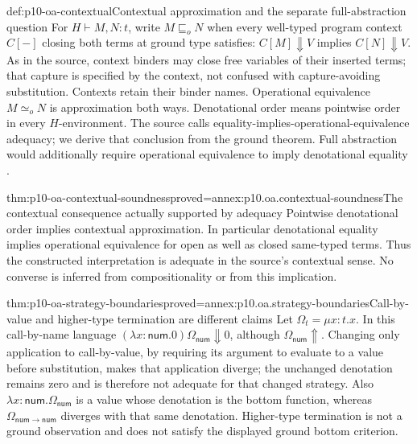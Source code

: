 \begin{hbdefinition}{def:p10-oa-contextual}{Contextual approximation and the separate full-abstraction question}
For \(H\vdash M,N:t\), write \(M\sqsubseteq_o N\) when every
well-typed program context \(C[-]\) closing both terms at ground type
satisfies: \(C[M]\Downarrow V\) implies \(C[N]\Downarrow V\).
As in the source, context binders may close free variables of their
inserted terms; that capture is specified by the context, not confused
with capture-avoiding substitution. Contexts retain their binder names.
Operational equivalence \(M\simeq_o N\) is approximation both ways.
Denotational order means pointwise order in every \(H\)-environment.
The source calls equality-implies-operational-equivalence adequacy;
we derive that conclusion from the ground theorem. Full abstraction
would additionally require operational equivalence to imply denotational
equality \cite[Section~4.3, p.~34]{Gunter1994TypesAuthorOA}.
\end{hbdefinition}

\begin{hbtheorem}{thm:p10-oa-contextual-soundness}{proved=annex:p10.oa.contextual-soundness}{The contextual consequence actually supported by adequacy}
Pointwise denotational order implies contextual approximation.
In particular denotational equality implies operational equivalence
for open as well as closed same-typed terms. Thus the constructed
interpretation is adequate in the source's contextual sense.
No converse is inferred from compositionality or from this implication.
\end{hbtheorem}

\begin{hbtheorem}{thm:p10-oa-strategy-boundaries}{proved=annex:p10.oa.strategy-boundaries}{Call-by-value and higher-type termination are different claims}
Let \(\Omega_t=\mu x:t.x\).
In this call-by-name language \((\lambda x:\mathsf{num}.0)\Omega_{\mathsf{num}}
\Downarrow0\), although \(\Omega_{\mathsf{num}}\Uparrow\).
Changing only application to call-by-value, by requiring its argument
to evaluate to a value before substitution, makes that application
diverge; the unchanged denotation remains zero and is therefore not
adequate for that changed strategy.
Also \(\lambda x:\mathsf{num}.\Omega_{\mathsf{num}}\) is a value
whose denotation is the bottom function, whereas
\(\Omega_{\mathsf{num}\to\mathsf{num}}\) diverges with that same
denotation. Higher-type termination is not a ground observation and
does not satisfy the displayed ground bottom criterion.
\end{hbtheorem}

